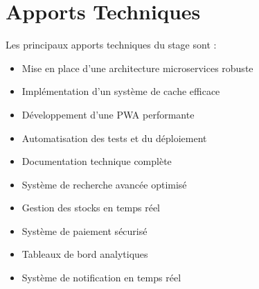 \section{Apports Techniques}
Les principaux apports techniques du stage sont :
\begin{itemize}
    \item Mise en place d'une architecture microservices robuste
    \item Implémentation d'un système de cache efficace
    \item Développement d'une PWA performante
    \item Automatisation des tests et du déploiement
    \item Documentation technique complète
    \item Système de recherche avancée optimisé
    \item Gestion des stocks en temps réel
    \item Système de paiement sécurisé
    \item Tableaux de bord analytiques
    \item Système de notification en temps réel
\end{itemize} 
